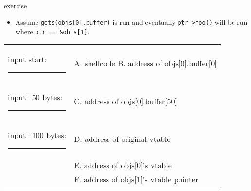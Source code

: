 \begin{frame}[fragile,label=vtExer]{exercise}
\begin{itemize}
\item Assume \verb|gets(objs[0].buffer)| is run and eventually \verb|ptr->foo()| will be run where \verb|ptr == &objs[1]|.
\end{itemize}
\small \begin{tabular}{ll}
input start: \rule{2cm}{.1mm} \hspace{1cm} & A. shellcode \hspace{1cm} B. address of objs[0].buffer[0] \\
input+50 bytes: \rule{2cm}{.1mm} \hspace{1cm} & C. address of objs[0].buffer[50]\\
input+100 bytes: \rule{2cm}{.1mm} \hspace{1cm} & D. address of original vtable \\
~ & E. address of objs[0]'s vtable \\
~ & F. address of objs[1]'s vtable pointer \\
\end{tabular}
\end{frame}

